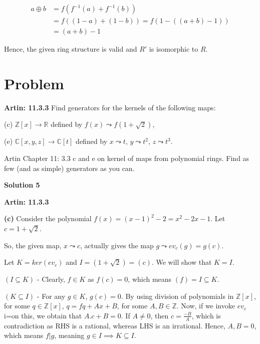 \documentclass[12pt,a4paper]{article}
\theoremstyle{definition}
\begin{document}
\begin{flushleft}
\begin{align*}
	a \oplus b &= f(f^{-1}(a) + f^{-1}(b)) \\
	&= f((1-a) + (1-b)) = f(1-((a+b)-1)) \\
	&= (a+b) -1
\end{align*}

Hence, the given ring structure is valid and $R'$ is isomorphic to $R$.

\newpage

\setcounter{section}{4}
\section{Problem}

{\bf Artin: 11.3.3} Find generators for the kernels of the following maps:

(c) $\mathbb{Z}[x] \to \mathbb{R}$ defined by $f(x) \leadsto f(1+ \sqrt{2})$,

(e) $\mathbb{C}[x,y,z] \to \mathbb{C}[t]$ defined by $x \leadsto t$, $y \leadsto t^2$, $z \leadsto t^3$.

\medskip

Artin Chapter 11: 3.3 c and e on kernel of maps from polynomial rings. Find as few (and as simple) generators as you can.

\bigskip

{\bf Solution 5}

\medskip

{\bf Artin: 11.3.3}

{\bf (c)} Consider the polynomial $f(x) = (x-1)^2 - 2 = x^2 -2x - 1 $. Let $c = 1 + \sqrt{2}$.

So, the given map, $x \leadsto c$, actually gives the map $g \leadsto ev_c (g) = g(c)$.

Let $K = ker(ev_c)$ and $I = (1 + \sqrt{2}) = (c)$. We will show that $K = I$.

\medskip

$(I \subseteq K)$ - Clearly, $f \in K$ as $f(c) = 0$, which means $(f) = I \subseteq K$.

\medskip

$(K \subseteq I)$ - For any $g \in K$, $g(c) = 0$. By using division of polynomials in $\mathbb{Z}[x]$, for some $q \in \mathbb{Z}[x]$, $q = fq + Ax + B$, for some $A,B \in \mathbb{Z}$. Now, if we invoke $ev_c$ i=on this, we obtain that $A.c + B = 0$. If $A \ne 0$, then $c = \frac{-B}{A}$, which is contradiction as RHS is a rational, whereas LHS is an irrational. Hence, $A,B = 0$, which means $f|g$, meaning $g \in I \implies K \subseteq I$.


\end{flushleft}
\end{document}

